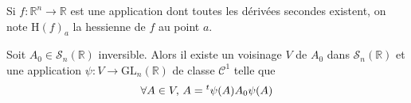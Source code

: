 





	\begin{notation}
		Si $f : \mathbb{R}^n \rightarrow \mathbb{R}$ est une application dont toutes les dérivées secondes existent, on note $\mathrm{H}(f)_a$ la hessienne de $f$ au point $a$.
	\end{notation}


	\begin{lemma}
		\label{lemme-de-morse-1}
		Soit $A_0 \in \mathcal{S}_n(\mathbb{R})$ inversible. Alors il existe un voisinage $V$ de $A_0$ dans $\mathcal{S}_n(\mathbb{R})$ et une application $\psi : V \rightarrow \mathrm{GL}_n(\mathbb{R})$ de classe $\mathcal{C}^1$ telle que
		\[ \forall A \in V, \, A = \mathstrut ^t \psi(A) A_0 \psi(A) \]
	\end{lemma}

